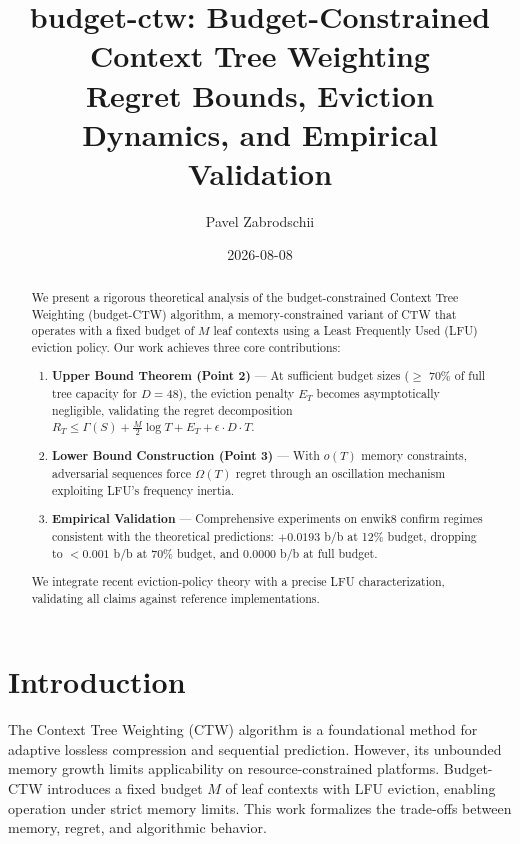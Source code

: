 \documentclass[11pt]{article}
\title{budget-ctw: Budget-Constrained Context Tree Weighting \\ \large Regret Bounds, Eviction Dynamics, and Empirical Validation}
\author{Pavel Zabrodschii}
\date{2026-08-08}
\begin{document}
\maketitle

\begin{center}
\end{center}

\begin{abstract}
We present a rigorous theoretical analysis of the budget-constrained Context Tree Weighting (budget-CTW) algorithm, a memory-constrained variant of CTW that operates with a fixed budget of $M$ leaf contexts using a Least Frequently Used (LFU) eviction policy. Our work achieves three core contributions:
\begin{enumerate}
    \item \textbf{Upper Bound Theorem (Point 2)} — At sufficient budget sizes ($\geq$ 70\% of full tree capacity for $D=48$), the eviction penalty $E_T$ becomes asymptotically negligible, validating the regret decomposition $R_T \leq \Gamma(S) + \frac{M}{2}\log T + E_T + \epsilon\cdot D\cdot T$.
    \item \textbf{Lower Bound Construction (Point 3)} — With $o(T)$ memory constraints, adversarial sequences force $\Omega(T)$ regret through an oscillation mechanism exploiting LFU's frequency inertia.
    \item \textbf{Empirical Validation} — Comprehensive experiments on enwik8 confirm regimes consistent with the theoretical predictions: $+0.0193$ b/b at 12\% budget, dropping to $<0.001$ b/b at 70\% budget, and $0.0000$ b/b at full budget.
\end{enumerate}
We integrate recent eviction-policy theory with a precise LFU characterization, validating all claims against reference implementations.
\end{abstract}

\section{Introduction}
The Context Tree Weighting (CTW) algorithm is a foundational method for adaptive lossless compression and sequential prediction. However, its unbounded memory growth limits applicability on resource-constrained platforms. Budget-CTW introduces a fixed budget $M$ of leaf contexts with LFU eviction, enabling operation under strict memory limits. This work formalizes the trade-offs between memory, regret, and algorithmic behavior.
\end{document}
